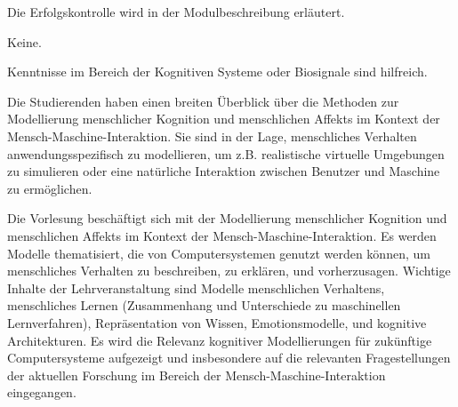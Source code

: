 \begin{course}

\setdoclanguagegerman
{}



\coursehead


\label{cour_8513.dp_997}


\begin{styleenv}
\begin{assessment}
Die Erfolgskontrolle wird in der Modulbeschreibung erläutert.


\end{assessment}

\begin{conditions}Keine.\end{conditions}

\begin{recommendations}Kenntnisse im Bereich der Kognitiven Systeme oder Biosignale sind hilfreich.

\end{recommendations}
\end{styleenv}

\begin{learningoutcomes}
Die Studierenden haben einen breiten Überblick über die Methoden zur Modellierung menschlicher Kognition und menschlichen Affekts im Kontext der Mensch-Maschine-Interaktion. Sie sind in der Lage, menschliches Verhalten anwendungsspezifisch zu modellieren, um z.B. realistische virtuelle Umgebungen zu simulieren oder eine natürliche Interaktion zwischen Benutzer und Maschine zu ermöglichen.


\end{learningoutcomes}

\begin{content}
Die Vorlesung beschäftigt sich mit der Modellierung menschlicher Kognition und menschlichen Affekts im Kontext der Mensch-Maschine-Interaktion. Es werden Modelle thematisiert, die von Computersystemen genutzt werden können, um menschliches Verhalten zu beschreiben, zu erklären, und vorherzusagen. \newline
\newline
 Wichtige Inhalte der Lehrveranstaltung sind Modelle menschlichen Verhaltens, menschliches Lernen (Zusammenhang und Unterschiede zu maschinellen Lernverfahren), Repräsentation von Wissen, Emotionsmodelle, und kognitive Architekturen. Es wird die Relevanz kognitiver Modellierungen für zukünftige Computersysteme aufgezeigt und insbesondere auf die relevanten Fragestellungen der aktuellen Forschung im Bereich der Mensch-Maschine-Interaktion eingegangen.



\end{content}
\end{course}
